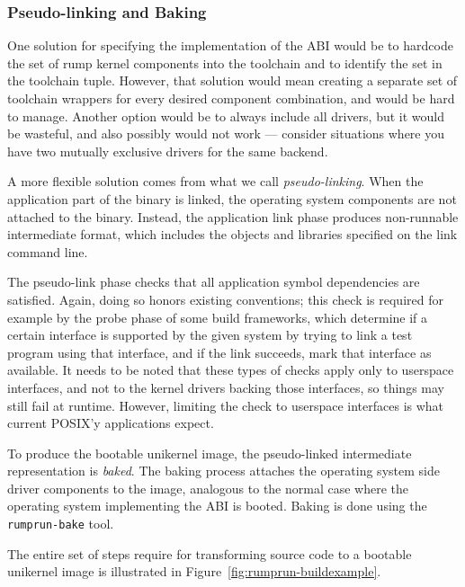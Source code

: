 \subsubsection*{Pseudo-linking and Baking}

One solution for specifying the implementation of the ABI would be to hardcode
the set of rump kernel components into the toolchain and to identify the
set in the toolchain tuple.
However, that solution would mean creating a separate set of toolchain wrappers
for every desired component combination, and would be hard to manage.
Another option would be to always include all drivers, but it would be
wasteful, and also possibly would not work --- consider situations where
you have two mutually exclusive drivers for the same backend.

A more flexible solution comes from what we call \textit{pseudo-linking}.  When the
application part of the binary is linked, the operating system components
are not attached to the binary.  Instead, the application link phase
produces non-runnable intermediate format, which includes the objects
and libraries specified on the link command line.

The pseudo-link phase checks that all application symbol
dependencies are satisfied.  Again, doing so honors existing
conventions; this check is required for example by the
probe phase of some build frameworks, which determine if a certain
interface is supported by the given system by trying to link a test
program using that interface, and if the link succeeds, mark that
interface as available.  It needs to be noted that these types of checks
apply only to userspace interfaces, and not to the kernel drivers backing
those interfaces, so things may still fail at runtime.  However,
limiting the check to userspace interfaces is what current POSIX'y
applications expect.

To produce the bootable unikernel image, the pseudo-linked intermediate
representation is \textit{baked}.  The baking process attaches the
operating system side driver components to the image, analogous to
the normal case where the operating system implementing the ABI is
booted.  Baking is done using the \verb+rumprun-bake+ tool.

The entire set of steps require for transforming source code to a bootable
unikernel image is illustrated in Figure~\ref{fig:rumprun-buildexample}.


